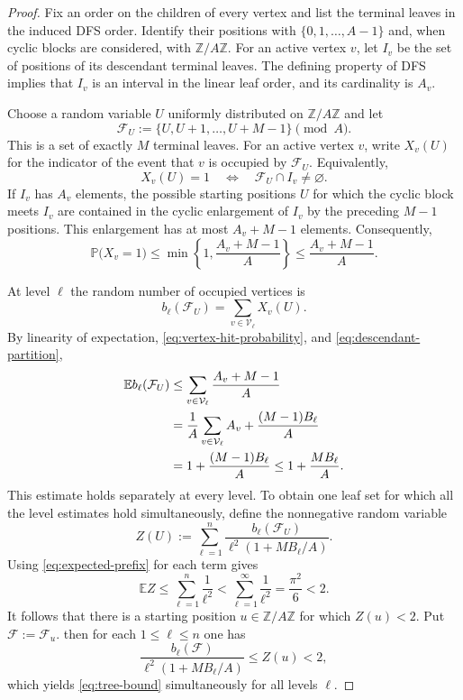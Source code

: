 \documentclass[10pt,a4paper]{amsart}
\newcommand{\Z}{\mathbb Z}
\numberwithin{equation}{section}
\begin{document}
	\begin{proof}
		Fix an order on the children of every vertex and list the terminal leaves in
		the induced DFS order.  Identify their positions with
		$\{0,1,\ldots,A-1\}$ and, when cyclic blocks are considered, with
		$\Z/A\Z$.  For an active vertex $v$, let $I_v$ be the set of positions of
		its descendant terminal leaves.  The defining property of DFS implies that
		$I_v$ is an interval in the linear leaf order, and its cardinality is $A_v$.

		Choose a random variable $U$ uniformly distributed on $\Z/A\Z$ and let
		\[
			\mathcal F_U
			:=
			\{U,U+1,\ldots,U+M-1\}\pmod A.
		\]
		This is a set of exactly $M$ terminal leaves.  For an active vertex $v$,
		write $X_v(U)$ for the indicator of the event that $v$ is occupied by
		$\mathcal F_U$.  Equivalently,
		\[
			X_v(U)=1
			\quad\Longleftrightarrow\quad
			\mathcal F_U\cap I_v\neq\varnothing.
		\]
		If $I_v$ has $A_v$ elements, the possible starting positions $U$ for which
		the cyclic block meets $I_v$ are contained in the cyclic enlargement of
		$I_v$ by the preceding $M-1$ positions.  This enlargement has at most
		$A_v+M-1$ elements.  Consequently,
		\begin{equation}
			\mathbb P\bigl(X_v=1\bigr)
			\leq
			\min\left\{1,\frac{A_v+M-1}{A}\right\}
			\leq
			\frac{A_v+M-1}{A}.
			\label{eq:vertex-hit-probability}
		\end{equation}

		At level $\ell$ the random number of occupied vertices is
		\[
			b_\ell(\mathcal F_U)
			=
			\sum_{v\in\mathcal V_\ell}X_v(U).
		\]
		By linearity of expectation, \eqref{eq:vertex-hit-probability}, and
		\eqref{eq:descendant-partition},
		\begin{align}
			\mathbb E b_\ell(\mathcal F_U)
			&\leq
			\sum_{v\in\mathcal V_\ell}
			\frac{A_v+M-1}{A}\notag\\
			&=
			\frac{1}{A}\sum_{v\in\mathcal V_\ell}A_v
			+\frac{(M-1)B_\ell}{A}\notag\\
			&=
			1+\frac{(M-1)B_\ell}{A}
			\leq
			1+\frac{MB_\ell}{A}.
			\label{eq:expected-prefix}
		\end{align}
		This estimate holds separately at every level.  To obtain one leaf set for
		which all the level estimates hold simultaneously, define the nonnegative
		random variable
		\[
			Z(U)
			:=
			\sum_{\ell=1}^n
			\frac{b_\ell(\mathcal F_U)}
			{\ell^2(1+MB_\ell/A)}.
		\]
		Using \eqref{eq:expected-prefix} for each term gives
		\[
			\mathbb E Z
			\leq
			\sum_{\ell=1}^n\frac1{\ell^2}
			<
			\sum_{\ell=1}^{\infty}\frac1{\ell^2}
			=
			\frac{\pi^2}{6}<2.
		\]
		It follows that there is a starting position $u\in\Z/A\Z$ for which
		$Z(u)<2$.  Put $\mathcal F:=\mathcal F_u$. then for each $1\leq\ell\leq n$ one has
		\[
			\frac{b_\ell(\mathcal F)}
			{\ell^2(1+MB_\ell/A)}
			\leq Z(u)<2,
		\]
		which yields \eqref{eq:tree-bound} simultaneously for
		all levels $\ell$.
	\end{proof}
	
\end{document}
